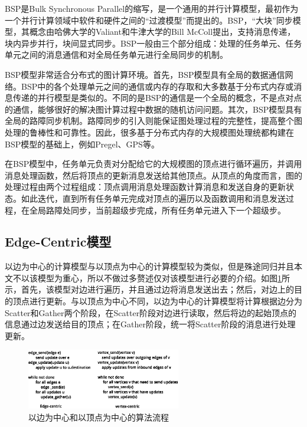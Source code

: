 BSP是Bulk Synchronous Parallel的缩写，是一个通用的并行计算模型，最初作为一个并行计算领域中软件和硬件之间的“过渡模型”而提出的。BSP，“大块”同步模型，其概念由哈佛大学的Valiant和牛津大学的Bill McColl提出，支持消息传递，块内异步并行，块间显式同步。BSP一般由三个部分组成：处理的任务单元、任务单元之间的消息通信和对全局任务单元进行全局同步的机制。

BSP模型非常适合分布式的图计算环境。首先，BSP模型具有全局的数据通信网络。BSP中的各个处理单元之间的通信或内存的存取和大多数基于分布式内存或消息传递的并行模型是类似的。不同的是BSP的通信是一个全局的概念，不是点对点的通信，能够很好的解决图计算过程中数据的随机访问问题。其次，BSP模型具有全局的路障同步机制。路障同步的引入则能保证图处理过程的完整性，提高整个图处理的鲁棒性和可靠性。因此，很多基于分布式内存的大规模图处理统都构建在BSP模型的基础上，例如Pregel、GPS等。

在BSP模型中，任务单元负责对分配给它的大规模图的顶点进行循环遍历，并调用消息处理函数，然后将顶点的更新消息发送给其他顶点。从顶点的角度而言，图的处理过程由两个过程组成：顶点调用消息处理函数计算消息和发送自身的更新状态。如此迭代，直到所有任务单元完成对顶点的遍历以及函数调用和消息发送过程，在全局路障处同步，当前超级步完成，所有任务单元进入下一个超级步。

\subsection{Edge-Centric模型}
以边为中心的计算模型\cite{roy2013x}与以顶点为中心的计算模型较为类似，但是殊途同归并且本文不以该模型为重心，所以不做过多赘述仅对该模型进行必要的介绍。如图\ref{fig:evc}所示，首先，该模型对边进行遍历，并且通过边将消息发送出去；然后，对边上的目的顶点进行更新。与以顶点为中心不同，以边为中心的计算模型将计算根据边分为Scatter和Gather两个阶段，在Scatter阶段对边进行读取，然后将边的起始顶点的信息通过边发送给目的顶点；在Gather阶段，统一将Scatter阶段的消息进行处理更新。

\begin{figure}[htbp]
\centering
\includegraphics[width=0.6\textwidth]{myfigures/edgevertexcentric.eps}
\vspace{0.5em}
\caption{以边为中心和以顶点为中心的算法流程}\label{fig:evc}
\end{figure}
